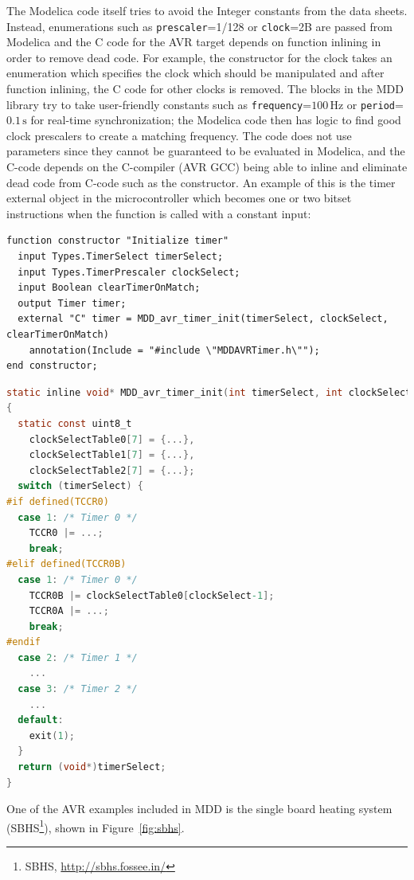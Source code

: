 \documentclass{resources/modelica}
\newcommand{\modelica}[1]{\lstinline[language=modelica]|#1|}
\begin{document}
The Modelica code itself tries to avoid the Integer constants from the
data sheets.
Instead, enumerations such as \modelica{prescaler}=1/128 or \modelica{clock}=2B are
passed from Modelica and the C code for the AVR target depends on
function inlining in order to remove dead code.
For example, the constructor for the clock takes an enumeration which
specifies the clock which should be manipulated and after function inlining, the
C code for other clocks is removed.
The blocks in the MDD library try to take user-friendly constants
such as \modelica{frequency}=$100\,\mathrm{Hz}$ or \modelica{period}=$0.1\,\mathrm{s}$ for real-time synchronization; the
Modelica code then has logic to find good clock prescalers to create a
matching frequency.
The code does not use parameters since they cannot be guaranteed to be
evaluated in Modelica, and the C-code depends on the C-compiler (AVR GCC)
being able to inline and eliminate dead code from C-code such as the constructor.
An example of this is the timer external object in the microcontroller which becomes one or two bitset
instructions when the function is called with a constant input:
\begin{lstlisting}[language=Modelica]
function constructor "Initialize timer"
  input Types.TimerSelect timerSelect;
  input Types.TimerPrescaler clockSelect;
  input Boolean clearTimerOnMatch;
  output Timer timer;
  external "C" timer = MDD_avr_timer_init(timerSelect, clockSelect, clearTimerOnMatch)
    annotation(Include = "#include \"MDDAVRTimer.h\"");
end constructor;
\end{lstlisting}
\begin{lstlisting}[language=C]
static inline void* MDD_avr_timer_init(int timerSelect, int clockSelect, int clearTimerOnMatch)
{
  static const uint8_t
    clockSelectTable0[7] = {...},
    clockSelectTable1[7] = {...},
    clockSelectTable2[7] = {...};
  switch (timerSelect) {
#if defined(TCCR0)
  case 1: /* Timer 0 */
    TCCR0 |= ...;
    break;
#elif defined(TCCR0B)
  case 1: /* Timer 0 */
    TCCR0B |= clockSelectTable0[clockSelect-1];
    TCCR0A |= ...;
    break;
#endif
  case 2: /* Timer 1 */
    ...
  case 3: /* Timer 2 */
    ...
  default:
    exit(1);
  }
  return (void*)timerSelect;
}
\end{lstlisting}
One of the AVR examples included in MDD is the single board heating system (SBHS\footnote{SBHS, \url{http://sbhs.fossee.in/}}), shown in Figure~\ref{fig:sbhs}.
\end{document}
